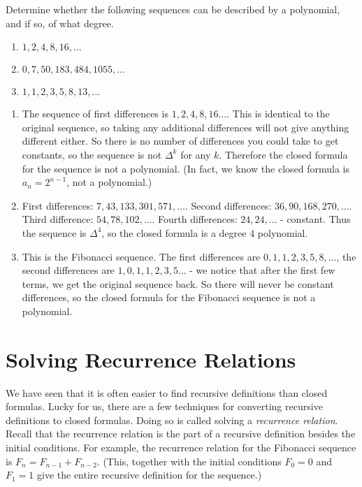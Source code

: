 \documentclass[12pt]{article}
\begin{document}
\begin{example}
  Determine whether the following sequences can be described by a polynomial, and if so, of what degree.
  \begin{enumerate}
    \item $1, 2, 4, 8, 16, \ldots$
    \item $0, 7, 50, 183, 484, 1055, \ldots$
    \item $1,1,2,3,5,8,13,\ldots$
  \end{enumerate}
\begin{solution}
  \begin{enumerate}
    \item The sequence of first differences is $1, 2, 4, 8, 16\ldots$.  This is identical to the original sequence, so taking any additional differences will not give anything different either.  So there is no number of differences you could take to get constants, so the sequence is not $\Delta^k$ for any $k$.  Therefore the closed formula for the sequence is not a polynomial.  (In fact, we know the closed formula is $a_n = 2^{n-1}$, not a polynomial.)
    \item First differences: $7, 43, 133, 301, 571,\ldots$.  Second differences: $36, 90, 168, 270,\ldots$.  Third difference: $54, 78, 102,\ldots$.  Fourth differences: $24, 24, \ldots$ - constant.  Thus the sequence is $\Delta^4$, so the closed formula is a degree 4 polynomial.
    \item This is the Fibonacci sequence.  The first differences are $0, 1, 1, 2, 3, 5, 8, \ldots$, the second differences are $1, 0, 1, 1, 2, 3,5\ldots$ - we notice that after the first few terms, we get the original sequence back.  So there will never be constant differences, so the closed formula for the Fibonacci sequence is not a polynomial.
  \end{enumerate}

\end{solution}

\end{example}


\section{Solving Recurrence Relations}

We have seen that it is often easier to find recursive definitions than closed formulas.  Lucky for us, there are a few techniques for converting recursive definitions to closed formulas.  Doing so is called solving a {\em recurrence relation}.  Recall that the recurrence relation is the part of a recursive definition besides the initial conditions.  For example, the recurrence relation for the Fibonacci sequence is $F_n = F_{n-1} + F_{n-2}$.  (This, together with the initial conditions $F_0 = 0$ and $F_1 = 1$ give the entire recursive definition for the sequence.)  
 
\end{document}
